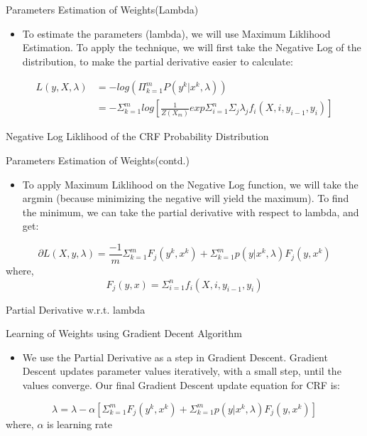 \documentclass[10pt]{beamer}
\theoremstyle{remark}
\theoremstyle{definition}
\begin{document}
\begin{frame}{Parameters Estimation of Weights(Lambda)}
\begin{itemize}
    \item To estimate the parameters (lambda), we will use Maximum Liklihood Estimation. To apply the technique, we will first take the Negative Log of the distribution, to make the partial derivative easier to calculate:
\end{itemize}
\begin{align*}
    L(y,X,\lambda) &= -log(\Pi_{k=1}^mP(y^k|x^k,\lambda))\\
    &= -\Sigma_{k=1}^mlog[\frac{1}{Z(X_m)}exp{\Sigma_{i=1}^n\Sigma_j\lambda_jf_i(X,i,y_{i-1},y_i)}]
\end{align*}
\begin{center}
    Negative Log Liklihood of the CRF Probability Distribution
\end{center}
\end{frame}
\begin{frame}{Parameters Estimation of Weights(contd.)}
    \begin{itemize}
        \item To apply Maximum Liklihood on the Negative Log function, we will take the argmin (because minimizing the negative will yield the maximum). To find the minimum, we can take the partial derivative with respect to lambda, and get:
    \end{itemize}
\begin{equation}
    \partial L(X,y,\lambda) = \frac{-1}{m}\Sigma_{k=1}^mF_j(y^k,x^k) + \Sigma_{k=1}^m p(y|x^k,\lambda)F_j(y,x^k)
\end{equation}
where,
\begin{equation}
    F_j(y,x) = \Sigma_{i=1}^nf_i(X,i,y_{i-1},y_i)
\end{equation}
\begin{center}
    Partial Derivative w.r.t. lambda
\end{center}
\end{frame}
\begin{frame}{Learning of Weights using Gradient Decent Algorithm}
\begin{itemize}
    \item We use the Partial Derivative as a step in Gradient Descent. Gradient Descent updates parameter values iteratively, with a small step, until the values converge. Our final Gradient Descent update equation for CRF is:
\end{itemize}
    \begin{equation}
        \lambda = \lambda - \alpha[\Sigma_{k=1}^mF_j(y^k,x^k) + \Sigma_{k=1}^m p(y|x^k,\lambda)F_j(y,x^k)]
    \end{equation}
where, \(\alpha\) is learning rate
\end{frame}
\end{document}
